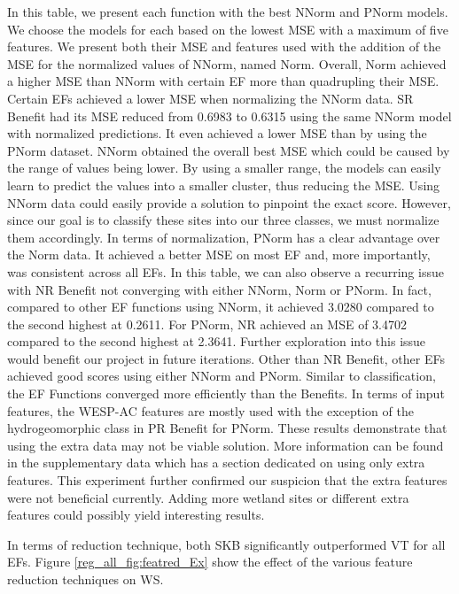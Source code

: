 \documentclass[12pt,letterpaper]{article}
\begin{document}
In this table, we present each function with the best \ac{NNorm} and \ac{PNorm} models.
We choose the models for each based on the lowest MSE with a maximum of five features.
We present both their MSE and features used with the addition of the MSE for the normalized values of \ac{NNorm}, named \ac{Norm}.
Overall, \ac{Norm} achieved a higher MSE than \ac{NNorm} with certain \ac{EF} more than quadrupling their MSE.
Certain \ac{EF}s achieved a lower MSE when normalizing the \ac{NNorm} data.
\ac{SR} Benefit had its MSE reduced from 0.6983 to 0.6315 using the same \ac{NNorm} model with normalized predictions.
It even achieved a lower MSE than by using the \ac{PNorm} dataset.
\ac{NNorm} obtained the overall best MSE which could be caused by the range of values being lower.
By using a smaller range, the models can easily learn to predict the values into a smaller cluster, thus reducing the MSE.
Using \ac{NNorm} data could easily provide a solution to pinpoint the exact score.
However, since our goal is to classify these sites into our three classes, we must normalize them accordingly.
In terms of normalization, \ac{PNorm} has a clear advantage over the \ac{Norm} data.
It achieved a better MSE on most \ac{EF} and, more importantly, was consistent across all \ac{EF}s.
In this table, we can also observe a recurring issue with \ac{NR} Benefit not converging with either \ac{NNorm}, \ac{Norm} or \ac{PNorm}.
In fact, compared to other \ac{EF} functions using \ac{NNorm}, it achieved 3.0280 compared to the second highest at 0.2611.
For \ac{PNorm}, \ac{NR} achieved an MSE of 3.4702 compared to the second highest at 2.3641.
Further exploration into this issue would benefit our project in future iterations.
Other than \ac{NR} Benefit, other \ac{EF}s achieved good scores using either \ac{NNorm} and \ac{PNorm}.
Similar to classification, the \ac{EF} Functions converged more efficiently than the Benefits.
In terms of input features, the \ac{WESP-AC} features are mostly used with the exception of the hydrogeomorphic class in \ac{PR} Benefit for \ac{PNorm}.
These results demonstrate that using the extra data may not be viable solution.
More information can be found in the supplementary data which has a section dedicated on using only extra features.
This experiment further confirmed our suspicion that the extra features were not beneficial currently.
Adding more wetland sites or different extra features could possibly yield interesting results.


In terms of reduction technique, both \ac{SKB} significantly outperformed \ac{VT} for all \ac{EF}s.
Figure \ref{reg_all_fig:featred_Ex} show the effect of the various feature reduction techniques on \ac{WS}.
\end{document}
